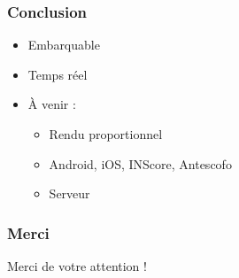 \documentclass[12pt]{beamer}
\begin{document}
    \begin{frame}
    \frametitle{Conclusion}
    
    
    \Large
    \begin{itemize}
      \item Embarquable
      \item Temps réel
      \vspace{5mm}
      \item \`A venir : \begin{itemize}
      \large
        \item Rendu proportionnel
        \item Android, iOS, INScore, Antescofo
        \item Serveur
      \end{itemize}
    \end{itemize}
    
    \end{frame}

    \begin{frame}
    \frametitle{Merci}

    \Huge
    \begin{center}
    Merci de votre attention !
    
    \end{center}
    \end{frame}
    
    
\end{document}

